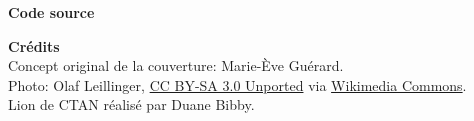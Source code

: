 \begin{frame}[t,plain,fragile=singleslide]
\begin{adjustwidth}{15mm}{15mm}
    \textbf{Code source} \\
    \viewsource{\ghurl}

    \textbf{Crédits} \\
    Concept original de la couverture: Marie-Ève Guérard. \\
    Photo: Olaf Leillinger,
    \href{https://creativecommons.org/licenses/by-sa/3.0/deed.en}{CC
      BY-SA 3.0 Unported} via
    \href{https://commons.wikimedia.org/wiki/File:Suricata.suricatta.6861.jpg}{%
      Wikimedia Commons}. \\
    Lion de CTAN réalisé par Duane Bibby.
  \end{adjustwidth}
\end{frame}

